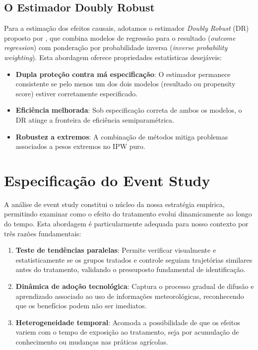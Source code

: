\documentclass[
	12pt,				%
	openright,			%
	oneside,			%
	a4paper,			%
	english,			%
	french,				%
	spanish,			%
	brazil				%
	]{abntex2}
\begin{document}
\subsection{O Estimador Doubly Robust}

Para a estimação dos efeitos causais, adotamos o estimador \textit{Doubly Robust} (DR) proposto por , que combina modelos de regressão para o resultado (\textit{outcome regression}) com ponderação por probabilidade inversa (\textit{inverse probability weighting}). Esta abordagem oferece propriedades estatísticas desejáveis:

\begin{itemize}
\item \textbf{Dupla proteção contra má especificação}: O estimador permanece consistente se pelo menos um dos dois modelos (resultado ou propensity score) estiver corretamente especificado.

\item \textbf{Eficiência melhorada}: Sob especificação correta de ambos os modelos, o DR atinge a fronteira de eficiência semiparamétrica.

\item \textbf{Robustez a extremos}: A combinação de métodos mitiga problemas associados a pesos extremos no IPW puro.
\end{itemize}

\section{Especificação do Event Study}

A análise de event study constitui o núcleo da nossa estratégia empírica, permitindo examinar como o efeito do tratamento evolui dinamicamente ao longo do tempo. Esta abordagem é particularmente adequada para nosso contexto por três razões fundamentais:

\begin{enumerate}
\item \textbf{Teste de tendências paralelas}: Permite verificar visualmente e estatisticamente se os grupos tratados e controle seguiam trajetórias similares antes do tratamento, validando o pressuposto fundamental de identificação.

\item \textbf{Dinâmica de adoção tecnológica}: Captura o processo gradual de difusão e aprendizado associado ao uso de informações meteorológicas, reconhecendo que os benefícios podem não ser imediatos.

\item \textbf{Heterogeneidade temporal}: Acomoda a possibilidade de que os efeitos variem com o tempo de exposição ao tratamento, seja por acumulação de conhecimento ou mudanças nas práticas agrícolas.
\end{enumerate}
\end{document}
